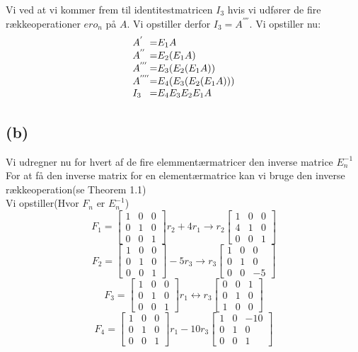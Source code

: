 \documentclass[a4paper,fleqn]{article}
\begin{document}
	Vi ved at vi kommer frem til identitestmatricen $I_3$ hvis vi udfører de fire 
	rækkeoperationer $ero_n$ på $A$. Vi opstiller derfor $I_3 = A^{''''}$. Vi opstiller nu:
	\begin{equation}
	\begin{array}{l @{=} l}
		A^{'} & E_1A\\
		A^{''} & E_2(E_1A)\\
		A^{'''} & E_3(E_2(E_1A))\\
		A^{''''}& E_4(E_3(E_2(E_1A)))\\
		I_3 & E_4E_3E_2E_1A
	\end{array}
	\end{equation}

	\subsection{(b)}
	Vi udregner nu for hvert af de fire elemmentærmatricer den inverse matrice $E_n^{-1}$\\
	For at få den inverse matrix for en elementærmatrice kan vi bruge den inverse
	rækkeoperation(se Theorem 1.1)\\
	Vi opstiller(Hvor $F_n$ er $E_n^{-1}$)
	\[ F_1 = \begin{bmatrix}1&0&0\\0&1&0\\0&0&1\end{bmatrix} r_2 + 4r_1 \rightarrow r_2 
	\begin{bmatrix} 1 & 0 & 0 \\ 4 & 1 & 0 \\ 0 & 0 & 1 \end{bmatrix} \]
	\[ F_2 = \begin{bmatrix}1&0&0\\0&1&0\\0&0&1\end{bmatrix} -5r_3 \rightarrow r_3
	\begin{bmatrix}1&0&0\\0&1&0\\0&0&-5\end{bmatrix}\]
	\[ F_3 = \begin{bmatrix}1&0&0\\0&1&0\\0&0&1\end{bmatrix} r_1 \leftrightarrow r_3 
	\begin{bmatrix}0&0&1\\0&1&0\\1&0&0\end{bmatrix}\]
	\[ F_4 = \begin{bmatrix}1&0&0\\0&1&0\\0&0&1\end{bmatrix} r_1 - 10r_3 
	\begin{bmatrix}1&0&-10\\0&1&0\\0&0&1\end{bmatrix}\]
\end{document}
